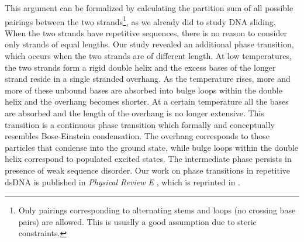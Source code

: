 This argument can be formalized by calculating the partition sum of all possible pairings between
the two strands\footnote{Only pairings corresponding to alternating stems and loops (no crossing base pairs) 
are allowed. This is usually a good assumption due to steric constraints.}, as we already did to study DNA sliding. 
When the two strands have repetitive sequences, there is no reason to consider only strands of equal
lengths. Our study revealed an additional phase transition, which occurs when the two strands
are of different length. At low temperatures, the two strands form a rigid double
helix and the excess bases of the longer strand reside in a single stranded overhang. 
As the temperature rises, more and more of these unbound bases are absorbed into 
bulge loops within the double helix and the overhang becomes shorter. At a certain temperature
 all the bases are absorbed and the length of the overhang is no longer extensive. This transition
is a continuous phase transition which formally and conceptually resembles Bose-Einstein
condensation. The overhang corresponds to those particles that condense into the ground 
state, while bulge loops within the double helix correspond to populated excited states.
The intermediate phase persists in presence of weak sequence disorder. 
Our work on phase transitions in repetitive dsDNA is published
 in \emph{Physical Review E} \cite{Neher_PRE_06}, which is reprinted in 
. 

